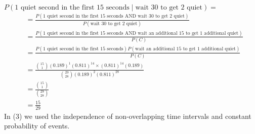 $ P(\text{1 quiet second in the first 15 seconds}\mid\text{wait 30 to get 2 quiet})= $
\begin{align}
     & =\frac{P(\text{1 quiet second in the first 15 seconds}\text{ AND wait 30 to get 2 quiet})}{P(\text{wait 30 to get 2 quiet})} \\
     & =\frac{P(\text{1 quiet second in the first 15 seconds} \text{ AND wait an additional 15 to get 1 additional quiet})}{P(C)}   \\
     & =\frac{P(\text{1 quiet second in the first 15 seconds})P(\text{wait an additional 15 to get 1 additional quiet}) }{P(C)}     \\
     & =\frac{\binom{15}{1}(0.189)^1(0.811)^{14}\times (0.811)^{14}(0.189)}
    {\binom{29}{28}(0.189)^2(0.811)^{28}}                                                                                           \\
     & =\frac{\binom{15}{1}}{\binom{29}{28}}                                                                                        \\
     & =\frac{15}{29}
\end{align}
In (3) we used the independence of non-overlapping time intervals and constant
probability of events.

